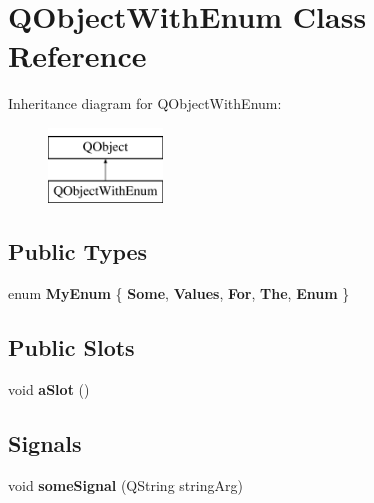\hypertarget{class_q_object_with_enum}{}\section{Q\+Object\+With\+Enum Class Reference}
\label{class_q_object_with_enum}
Inheritance diagram for Q\+Object\+With\+Enum\+:\begin{figure}[H]
\begin{center}
\leavevmode
\includegraphics[height=2.000000cm]{class_q_object_with_enum}
\end{center}
\end{figure}
\subsection*{Public Types}
\begin{DoxyCompactItemize}
\item 
\mbox{\label{class_q_object_with_enum_a71fd39e735c6f68d05353d5e311a0e36}} 
enum {\bfseries My\+Enum} \{ \newline
{\bfseries Some}, 
{\bfseries Values}, 
{\bfseries For}, 
{\bfseries The}, 
\newline
{\bfseries Enum}
 \}
\end{DoxyCompactItemize}
\subsection*{Public Slots}
\begin{DoxyCompactItemize}
\item 
\mbox{\label{class_q_object_with_enum_a0e33050c9e7210e726c46b8af418ceab}} 
void {\bfseries a\+Slot} ()
\end{DoxyCompactItemize}
\subsection*{Signals}
\begin{DoxyCompactItemize}
\item 
\mbox{\label{class_q_object_with_enum_a88f5bc772890add045fd5824a70b099b}} 
void {\bfseries some\+Signal} (Q\+String string\+Arg)
\end{DoxyCompactItemize}
